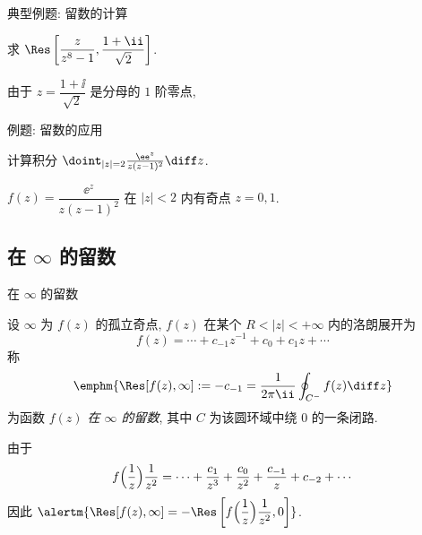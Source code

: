 \begin{frame}{典型例题: 留数的计算}
	\onslide<+->
	\begin{example}
		求 $\Res\left[\dfrac{z}{z^8-1},\dfrac{1+\ii}{\sqrt2}\right]$.
	\end{example}

	\onslide<+->
	\begin{solution}
			由于 $z=\dfrac{1+\ii}{\sqrt2}$ 是分母的 $1$ 阶零点,
		\onslide<+->{因此
			\[\Res\left[\frac z{z^8-1},\frac{1+\ii}{\sqrt2}\right]
			=\frac z{(z^8-1)'}\Big|_{z=\frac{1+\ii}{\sqrt2}}
			=\frac z{8z^7}\Big|_{z=\frac{1+\ii}{\sqrt2}}
			=\frac i8.
	\]
		}
	\end{solution}
\end{frame}


\begin{frame}{例题: 留数的应用}
	\beqskip{5pt}
	\onslide<+->
	\begin{example}
		计算积分 $\doint_{|z|=2}\frac{\ee^z}{z(z-1)^2}\diff z$.
	\end{example}

	\onslide<+->
	\begin{solution}
			$f(z)=\dfrac{\ee^z}{z(z-1)^2}$ 在 $|z|<2$ 内有奇点 $z=0,1$.
		\onslide<+->{%
	\[
		\oint_{|z|=2}\frac{\ee^z}{z(z-1)^2}\diff z
			=2\pi\ii\bigl[\Res[f(z),0]+\Res[f(z),1]\bigr]
			=2\pi\ii.
	\]
		}
		\vspace{-0.7\baselineskip}
	\end{solution}
	\endgroup
\end{frame}


\subsection{在 \texorpdfstring{$\infty$}{∞} 的留数}

\begin{frame}{在 $\infty$ 的留数\noexer}
	\onslide<+->
	\begin{definition}
		设 $\infty$ 为 $f(z)$ 的孤立奇点, $f(z)$ 在某个 $R<|z|<+\infty$ 内的洛朗展开为
	\[
		f(z)=\cdots+c_{-1}z^{-1}+c_0+c_1z+\cdots
	\]
		称
	\[
		\emphm{\Res[f(z),\infty]:=-c_{-1}=\frac1{2\pi\ii}\oint_{C^-}f(z)\diff z}
	\]
		为函数 \emph{$f(z)$ 在 $\infty$ 的留数}, 其中 $C$ 为该圆环域中绕 $0$ 的一条闭路.
	\end{definition}

	\onslide<+->
	由于
	\[f\Bigl(\frac1z\Bigr)\frac1{z^2}=\cdots+\frac{c_1}{z^3}+\frac{c_0}{z^2}+\frac{c_{-1}}z+c_{-2}+\cdots
	\]
	\onslide<+->
	因此 $\displaystyle\alertm{\Res[f(z),\infty]=-\Res\left[f\Bigl(\frac1z\Bigr)\frac1{z^2},0\right]}$.
\end{frame}


